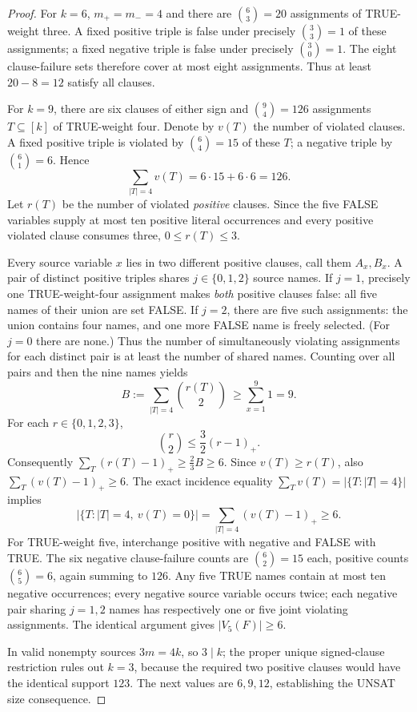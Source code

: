 \documentclass[11pt]{article}
\begin{document}
\begin{proof}
For \(k=6\), \(m_+=m_-=4\) and there are \(\binom63=20\) assignments of TRUE-weight three. A fixed positive triple is false under precisely \(\binom3{3}=1\) of these assignments; a fixed negative triple is false under precisely \(\binom3{0}=1\). The eight clause-failure sets therefore cover at most eight assignments. Thus at least \(20-8=12\) satisfy all clauses.

For \(k=9\), there are six clauses of either sign and \(\binom94=126\) assignments \(T\subseteq[k]\) of TRUE-weight four. Denote by \(v(T)\) the number of violated clauses. A fixed positive triple is violated by \(\binom64=15\) of these \(T\); a negative triple by \(\binom61=6\). Hence
\[
\sum_{|T|=4}v(T)=6\cdot15+6\cdot6=126.
\]
Let \(r(T)\) be the number of violated \emph{positive} clauses. Since the five FALSE variables supply at most ten positive literal occurrences and every positive violated clause consumes three, \(0\le r(T)\le3\).

Every source variable \(x\) lies in two different positive clauses, call them \(A_x,B_x\). A pair of distinct positive triples shares \(j\in\{0,1,2\}\) source names. If \(j=1\), precisely one TRUE-weight-four assignment makes \emph{both} positive clauses false: all five names of their union are set FALSE. If \(j=2\), there are five such assignments: the union contains four names, and one more FALSE name is freely selected. (For \(j=0\) there are none.) Thus the number of simultaneously violating assignments for each distinct pair is at least the number of shared names. Counting over all pairs and then the nine names yields
\[
B:=\sum_{|T|=4}\binom{r(T)}2\ \ge\sum_{x=1}^9 1=9.
\]
For each \(r\in\{0,1,2,3\}\),
\[
\binom r2\le\frac32(r-1)_+.
\]
Consequently \(\sum_T(r(T)-1)_+\ge\frac23B\ge6\). Since \(v(T)\ge r(T)\), also \(\sum_T(v(T)-1)_+\ge6\). The exact incidence equality \(\sum_Tv(T)=|\{T:|T|=4\}|\) implies
\[
|\{T:|T|=4,\ v(T)=0\}|=\sum_{|T|=4}(v(T)-1)_+\ge6.
\]
For TRUE-weight five, interchange positive with negative and FALSE with TRUE. The six negative clause-failure counts are \(\binom62=15\) each, positive counts \(\binom65=6\), again summing to \(126\). Any five TRUE names contain at most ten negative occurrences; every negative source variable occurs twice; each negative pair sharing \(j=1,2\) names has respectively one or five joint violating assignments. The identical argument gives \(|V_5(F)|\ge6\).

In valid nonempty sources \(3m=4k\), so \(3\mid k\); the proper unique signed-clause restriction rules out \(k=3\), because the required two positive clauses would have the identical support \(123\). The next values are \(6,9,12\), establishing the UNSAT size consequence.
\end{proof}
\end{document}
